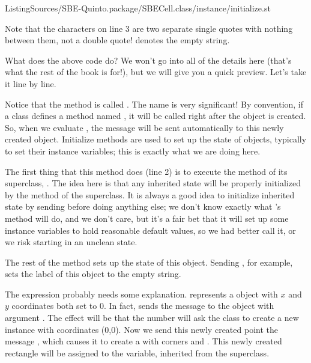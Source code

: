 \documentclass[a4paper,10pt,twoside]{book}
\begin{document}
%
{ListingSources/SBE-Quinto.package/SBECell.class/instance/initialize.st}	

\noindent
Note that the characters  on line 3 are two separate single quotes with nothing between them, not a double quote!   denotes the empty string.


What does the above code do?  We won't go into all of the details here (that's what the rest of the book is for!), but we will give you a quick preview.  Let's take it line by line.

Notice that the method is called .
The name is very significant!
By convention, if a class defines a method named , it will be called right after the object is created.
So, when we evaluate , the message  will be sent automatically to this newly created object.
Initialize methods are used to set up the state of objects, typically to set their instance variables; this is exactly what we are doing here.

The first thing that this method does (line 2) is to execute the  method of its superclass, .
The idea here is that any inherited state will be properly initialized by the  method of the superclass.
It is always a good idea to initialize inherited state by sending  before doing anything else; we don't know exactly what 's  method will do, and we don't care, but it's a fair bet that it will set up some instance variables to hold reasonable default values, so we had better call it, or we risk starting in an unclean state.

The rest of the method sets up the state of this object.
Sending , for example, sets the label of this object to the empty string.

The expression  probably needs some explanation. 
 represents a  object with $x$ and $y$ coordinates both set to 0.
In fact,  sends the message  to the  object  with argument .
The effect will be that the number  will ask the  class to create a new instance with coordinates (0,0).
Now we send this newly created point the message , which causes it to create a  with corners  and .
This newly created rectangle will be assigned to the  variable, inherited from the superclass.
\end{document}
